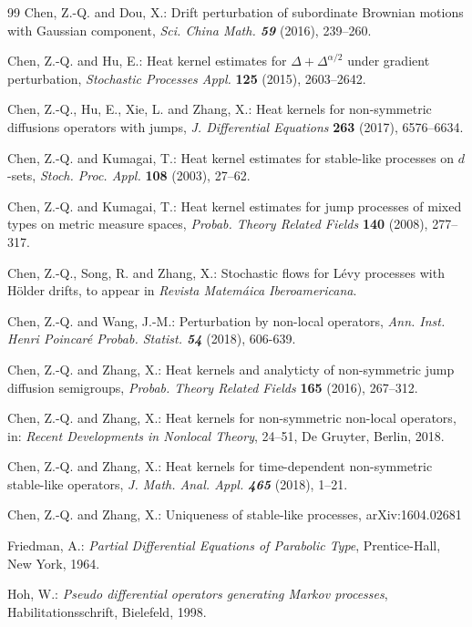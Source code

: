 \documentclass[a4paper,11pt]{amsart}
\theoremstyle{definition}
\begin{document}
\begin{thebibliography}{99}
 Chen, Z.-Q. and Dou, X.:
Drift perturbation of subordinate Brownian motions with Gaussian component,
{\it Sci. China Math. \bf 59} (2016), 239--260.

 Chen, Z.-Q. and Hu, E.:
Heat kernel estimates for $\Delta + \Delta^{\alpha/2}$ under gradient perturbation,
\emph{Stochastic Processes Appl.} {\bf125} (2015), 2603--2642.

  Chen, Z.-Q., Hu, E., Xie, L. and Zhang, X.:
Heat kernels for non-symmetric diffusions operators with jumps,
\emph{J. Differential Equations} {\bf263} (2017), 6576--6634.

Chen, Z.-Q. and Kumagai, T.: Heat kernel estimates for stable-like processes on $d$-sets,
\emph{Stoch. Proc. Appl.} \textbf{108} (2003), 27--62.

Chen, Z.-Q. and Kumagai, T.: Heat kernel estimates for jump processes of mixed types on metric measure spaces,
\emph{Probab. Theory Related Fields} \textbf{140} (2008), 277--317.

Chen, Z.-Q., Song, R. and Zhang, X.: Stochastic flows for L\'evy
processes with H\"older drifts,
to appear in {\it  Revista Matem\'{a}ica Iberoamericana}.


 Chen, Z.-Q. and Wang, J.-M.:
Perturbation by non-local operators,
  {\it Ann. Inst. Henri Poincar\'e Probab. Statist. \bf 54} (2018), 606-639.

Chen, Z.-Q. and Zhang, X.: Heat kernels and analyticty of non-symmetric jump diffusion semigroups,
\emph{Probab. Theory Related Fields} \textbf{165} (2016),  267--312.

Chen, Z.-Q. and Zhang, X.: Heat kernels for non-symmetric non-local operators, in:
 {\it Recent Developments in Nonlocal Theory}, 24--51, De Gruyter, Berlin, 2018.

Chen, Z.-Q. and Zhang, X.:
 Heat kernels for time-dependent non-symmetric stable-like operators,
{\it J. Math. Anal. Appl. \bf 465} (2018), 1--21.

Chen, Z.-Q. and Zhang, X.:
Uniqueness of stable-like processes, arXiv:1604.02681

Friedman, A.: \emph{Partial Differential Equations of Parabolic
Type}, Prentice-Hall, New York, 1964.

Hoh, W.: \emph{Pseudo differential operators generating Markov processes}, Habilitationsschrift, Bielefeld, 1998.



\end{thebibliography}
\end{document}
